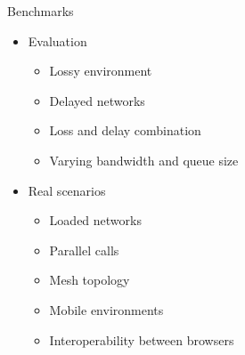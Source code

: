 \documentclass[first=red,second=purple,logo=yellowexc]{aaltoslides}
\begin{document}
%
%

\begin{frame}{Benchmarks}

\begin{itemize}
\item Evaluation
\begin{itemize}
\item Lossy environment
\item Delayed networks
\item Loss and delay combination
\item Varying bandwidth and queue size
\end{itemize}

\item Real scenarios
\begin{itemize}
\item Loaded networks
\item Parallel calls
\item Mesh topology
\item Mobile environments
\item Interoperability between browsers
\end{itemize}

\end{itemize}

\end{frame}
\end{document}
